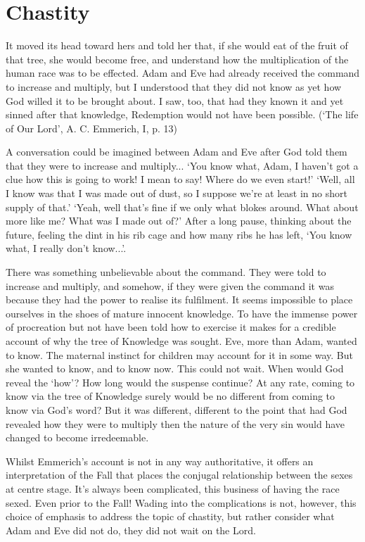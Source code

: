 \documentclass[12pt]{article}
\begin{document}
\section*{Chastity}

\begin{displayquote}
It moved its head toward hers and told her that, if she would eat of the fruit of that tree, she would become free, and understand how the multiplication of the human race was to be effected. Adam and Eve had already received the command to increase and multiply, but I understood that they did not know as yet how God willed it to be brought about. I saw, too, that had they known it and yet sinned after that knowledge, Redemption would not have been possible.
(`The life of Our Lord', A. C. Emmerich, I, p. 13)
\end{displayquote}

A conversation could be imagined between Adam and Eve after God told them that they were to increase and multiply... `You know what, Adam, I haven't got a clue how this is going to work! I mean to say! Where do we even start!' `Well, all I know was that I was made out of dust, so I suppose we're at least in no short supply of that.' `Yeah, well that's fine if we only what blokes around. What about more like me? What was I made out of?' After a long pause, thinking about the future, feeling the dint in his rib cage and how many ribs he has left, `You know what, I really don't know...'.

There was something unbelievable about the command. They were told to increase and multiply, and somehow, if they were given the command it was because they had the power to realise its fulfilment. It seems impossible to place ourselves in the shoes of mature innocent knowledge. To have the immense power of procreation but not have been told how to exercise it makes for a credible account of why the tree of Knowledge was sought. Eve, more than Adam, wanted to know. The maternal instinct for children may account for it in some way. But she wanted to know, and to know now. This could not wait. When would God reveal the `how'? How long would the suspense continue? At any rate, coming to know via the tree of Knowledge surely would be no different from coming to know via God's word? But it was different, different to the point that had God revealed how they were to multiply then the nature of the very sin would have changed to become irredeemable.

Whilst Emmerich's account is not in any way authoritative, it offers an interpretation of the Fall that places the conjugal relationship between the sexes at centre stage. It's always been complicated, this business of having the race sexed. Even prior to the Fall! Wading into the complications is not, however, this choice of emphasis to address the topic of chastity, but rather consider what Adam and Eve did not do, they did not wait on the Lord.
\end{document}
